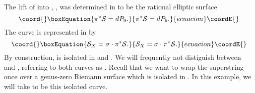 \documentclass[a4paper,12pt]{article}
\numberwithin{equation}{section}
\theoremstyle{plain}
\begin{document}
%
The lift of \coordHE{} into \coordHE{}, \coordHE{}, was determined
in \cite{BDOold} to be the rational elliptic surface
%
\begin{equation}\coord{}\boxEquation{
\pi^{*}{\cal S} =dP_{9}.
\label{40}
}{
\pi^{*}{\cal S} =dP_{9}.
}{ecuacion}\coordE{}\end{equation}
%
The curve \coordHE{} is represented in \coordHE{} by
%
\begin{equation}\coord{}\boxEquation{
{\cal S}_{X} =\sigma \cdot \pi^{*}{\cal S}.
\label{41}
}{
{\cal S}_{X} =\sigma \cdot \pi^{*}{\cal S}.
}{ecuacion}\coordE{}\end{equation}
%
By construction, \coordHE{} is isolated in \coordHE{} and
\coordHE{}. We will frequently not distiguish between
\coordHE{} and \coordHE{}, referring to both curves as \coordHE{}.
Recall that we want to wrap the superstring once over a genus-zero Riemann
surface
\coordHE{} which is isolated in \coordHE{}. In this example, we will take
\coordHE{} to be this isolated curve.
\end{document}

